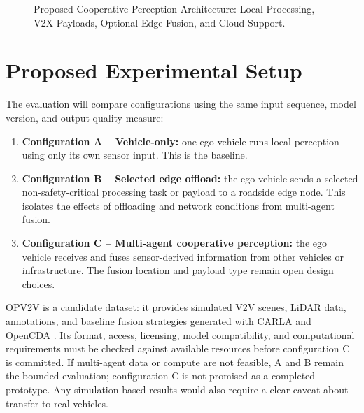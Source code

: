\documentclass[12pt,a4paper,oneside]{report}
\begin{document}
\begin{figure}[H]
{%
  }
  \caption{Proposed Cooperative-Perception Architecture: Local Processing, V2X Payloads, Optional Edge Fusion, and Cloud Support.}
  \label{fig:proposed-av-architecture}
\end{figure}

\section{Proposed Experimental Setup}

The evaluation will compare configurations using the same input sequence,
model version, and output-quality measure:
\begin{enumerate}
  \item \textbf{Configuration A -- Vehicle-only:} one ego vehicle runs
  local perception using only its own sensor input. This is the baseline.
  \item \textbf{Configuration B -- Selected edge offload:} the ego vehicle
  sends a selected non-safety-critical processing task or payload to a
  roadside edge node. This isolates the effects of offloading and network
  conditions from multi-agent fusion.
  \item \textbf{Configuration C -- Multi-agent cooperative perception:}
  the ego vehicle receives and fuses sensor-derived information from other
  vehicles or infrastructure. The fusion location and payload type remain
  open design choices.
\end{enumerate}

OPV2V is a candidate dataset: it provides simulated V2V scenes, LiDAR data,
annotations, and baseline fusion strategies generated with CARLA and
OpenCDA \cite{opv2v2022}. Its format, access, licensing, model compatibility,
and computational requirements must be checked against available resources
before configuration C is committed. If multi-agent data or compute are
not feasible, A and B remain the bounded evaluation; configuration C is
not promised as a completed prototype. Any simulation-based results would
also require a clear caveat about transfer to real vehicles.
\end{document}
